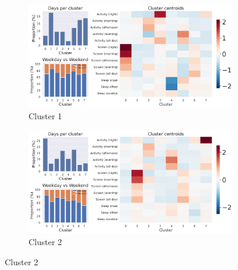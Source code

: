 \begin{appendices}
\begin{figure}[p]
  \begin{subfigure}[t]{0.485\textwidth}
    \centering
    \includegraphics[width=\linewidth]{figures/appendix/globem_INS-W_1_summary.png}
    \caption{Cluster 1}
    \label{fig:globem_centroids_a}
  \end{subfigure}\hfill
  \begin{subfigure}[t]{0.485\textwidth}
    \centering
    \includegraphics[width=\linewidth]{figures/appendix/globem_INS-W_2_summary.png}
    \caption{Cluster 2}
    \label{fig:globem_centroids_b}
  \end{subfigure}

  \medskip


\end{figure}
\end{appendices}

